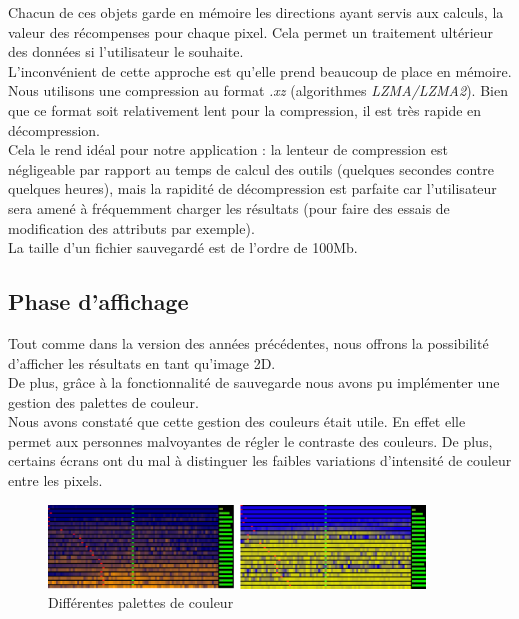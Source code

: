 \documentclass[12pt]{article}
\begin{document}
Chacun de ces objets garde en mémoire les directions ayant servis aux calculs, la valeur des récompenses pour chaque pixel. Cela permet un traitement ultérieur des données si l'utilisateur le souhaite. \\

L'inconvénient de cette approche est qu'elle prend beaucoup de place en mémoire. \\

Nous utilisons une compression au format \emph{.xz} (algorithmes \emph{LZMA/LZMA2}). Bien que ce format soit relativement lent pour la compression, il est très rapide en décompression. \\

Cela le rend idéal pour notre application : la lenteur de compression est négligeable par rapport au temps de calcul des outils (quelques secondes contre quelques heures), mais la rapidité de décompression est parfaite car l'utilisateur sera amené à fréquemment charger les résultats (pour faire des essais de modification des attributs par exemple). \\

La taille d'un fichier sauvegardé est de l'ordre de 100Mb. \\

\newpage
\subsection{Phase d'affichage}

Tout comme dans la version des années précédentes, nous offrons la possibilité d'afficher les résultats en tant qu'image 2D. \\

De plus, grâce à la fonctionnalité de sauvegarde nous avons pu implémenter une gestion des palettes de couleur. \\

Nous avons constaté que cette gestion des couleurs était utile. En effet elle permet aux personnes malvoyantes de régler le contraste des couleurs. De plus, certains écrans ont du mal à distinguer les faibles variations d'intensité de couleur entre les pixels. \\

\begin{figure}[htp]
    \centering
    \includegraphics[width=10cm]{Images/palette}
    \caption{Différentes palettes de couleur}
    \label{fig:palette}
\end{figure}
\end{document}
